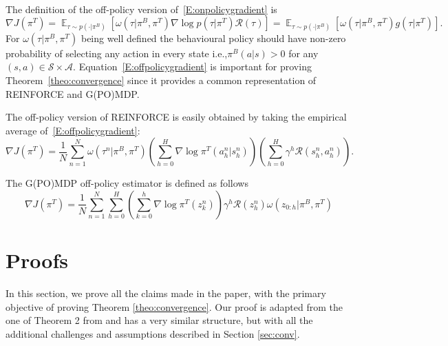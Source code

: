 \documentclass{article}
\makeatletter
\theoremstyle{remark}
\theoremstyle{definition}
\DeclareRobustCommand{\eg}{e.g.,\@\xspace}
\DeclareRobustCommand{\ie}{i.e.,\@\xspace}
\newcommand{\todopir}[1]{\todo[color=blued, inline]{\small #1}}
\DeclareMathOperator*{\EV}{\mathbb{E}}
\newcommand{\EVV}[2][\ppvect \in \ppspace]{\EV_{#1}\left[{#2}\right]}
\newcommand{\Reward}{\mathcal{R}}
\makeatother
\begin{document}
The definition of the off-policy version of~\eqref{E:onpolicygradient} is~\citep[\eg][]{jurvcivcek2012reinforcement}
\begin{equation}\label{E:offpolicygradient}
        \nabla J(\pi^T) = \EVV[\tau \sim p(\cdot|\pi^B)]{\omega(\tau|\pi^B,\pi^T) \nabla \log p(\tau|\pi^T) \mathcal{R}(\tau)} = \EVV[\tau \sim p(\cdot|\pi^B)]{\omega(\tau|\pi^B,\pi^T) g(\tau|\pi^T)}. 
\end{equation}
For $\omega(\tau|\pi^B,\pi^T)$ being well defined the behavioural policy should have non-zero probability of selecting any action in every state \ie $\pi^B(a|s) > 0$ for any $(s,a)\in \mathcal{S} \times \mathcal{A}$.
Equation~\ref{E:offpolicygradient} is important for proving Theorem~\ref{theo:convergence} since it provides a common representation of REINFORCE and G(PO)MDP.

The off-policy version of REINFORCE is easily obtained by taking the empirical average of~\eqref{E:offpolicygradient}:
\[
        \nabla J(\pi^T) = \frac{1}{N} \sum_{n=1}^{N} \omega(\tau^n|\pi^B, \pi^T)
        \left(\sum_{h=0}^{H} \nabla \log \pi^{T}(a_h^n\vert s_h^n) \right)\left(\sum_{h=0}^{H}\gamma^h \Reward(s_h^n,a_h^n)\right).
\]

The G(PO)MDP off-policy estimator is defined as follows
\[
        \nabla J(\pi^T) = \frac{1}{N} \sum_{n=1}^{N}
        \sum_{h=0}^H \left(\sum_{k=0}^h \nabla \log\pi^T(z_k^n)\right) \gamma^h \Reward(z_h^n) \omega(z_{0:h}|\pi^B,\pi^T)
\]




\section{Proofs}\label{app:proofs}
In this section, we prove all the claims made in the paper, with the primary objective of proving Theorem \ref{theo:convergence}.
Our proof is adapted from the one of Theorem 2 from \cite{reddi2016stochastic} and has a very similar structure, but with all the additional challenges and assumptions described in Section \ref{sec:conv}.
\end{document}
